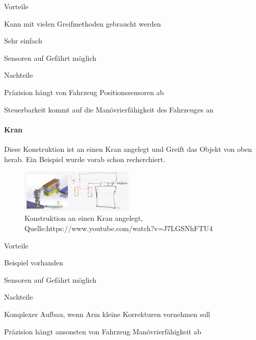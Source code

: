 \begin{minipage}[t]{0.48\textwidth}
    \begin{items}
          \item [Vorteile]
          \item Kann mit vielen Greifmethoden gebraucht werden
          \item Sehr einfach
          \item Sensoren auf Gefährt möglich
    \end{items}
\end{minipage}
\hfill
\begin{minipage}[t]{0.48\textwidth}
    \begin{items}
          \item [Nachteile]
          \item Präzision hängt von Fahrzeug Positionssensoren ab
          \item Steuerbarkeit kommt auf die Manövrierfähigkeit des Fahrzeuges an 
    \end{items}
\end{minipage}
\newpage
\paragraph{Kran}
Diese Konstruktion ist an einen Kran angelegt und Greift das Objekt von oben herab. Ein Beispiel wurde vorab schon recherchiert.

\begin{figure}
        \centering
        \includegraphics[width=0.48\textwidth]{img/technologierecherche/Rotation/seitlich_mit_rotation.jpg}
        \caption{Konstruktion an einen Kran angelegt, Quelle:https://www.youtube.com/watch?v=J7LGSNhFTU4} 
        \label{img:tech_seitlich_mit_rotation}
\end{figure}

\begin{minipage}[t]{0.48\textwidth}
    \begin{items}
          \item [Vorteile]
          \item Beispiel vorhanden
          \item Sensoren auf Gefährt möglich
    \end{items}
\end{minipage}
\hfill
\begin{minipage}[t]{0.48\textwidth}
    \begin{items}
          \item [Nachteile]
          \item Komplexer Aufbau, wenn Arm kleine Korrekturen vornehmen soll
          \item Präzision hängt ansonsten von Fahrzeug Manövrierfähigkeit ab
    \end{items}
\end{minipage}
\newpage
